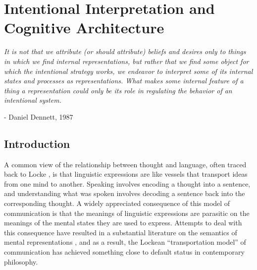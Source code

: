 
\chapter{Intentional Interpretation and Cognitive Architecture}
\renewcommand{\epigraphrule}{0pt}
\setlength{\epigraphwidth}{4.5in}
\epigraph{\textit{It is not that we attribute (or should attribute) beliefs and desires only to things in which we find internal representations, but rather that we find some object for which the intentional strategy works, we endeavor to interpret some of its internal states and processes as representations. What makes some internal feature of a thing a representation could only be its role in regulating the behavior of an intentional system.}}{- Daniel Dennett, 1987}

\section{Introduction}

A common view of the relationship between thought and language, often traced back to Locke \citep{Brandom:1994,KortaPerry:2015}, is that linguistic expressions are like vessels that transport ideas from one mind to another. Speaking involves encoding a thought into a sentence, and understanding what was spoken involves decoding a sentence back into the corresponding thought. A widely appreciated consequence of this model of communication is that the meanings of linguistic expressions are parasitic on the meanings of the mental states they are used to express. Attempts to deal with this consequence have resulted in a substantial literature on the semantics of mental representations \citep{Fodor:1998,Block:1986,Harman:1982}, and as a result, the Lockean ``transportation model'' of communication has achieved something close to default status in contemporary philosophy. 

